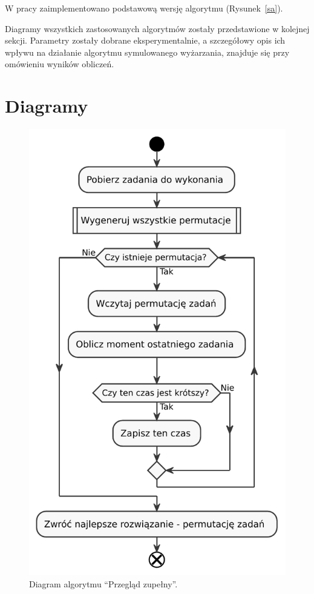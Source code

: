 \breakparagraph{}
W pracy zaimplementowano podstawową wersję algorytmu (Rysunek~\ref{sa}).

\breakparagraph{}
Diagramy wszystkich zastosowanych algorytmów zostały przedstawione w kolejnej sekcji. Parametry zostały dobrane eksperymentalnie, a szczegółowy opis ich wpływu na działanie algorytmu symulowanego wyżarzania, znajduje się przy omówieniu wyników obliczeń.
\raggedbottom{}

\section{Diagramy}
\begin{figure}[H]
	\centering
	\includegraphics[]{chapters/chapter4/brute_force.pdf}
	\caption{Diagram algorytmu ``Przegląd zupełny''.}
	\label{brute_force}
\end{figure}

